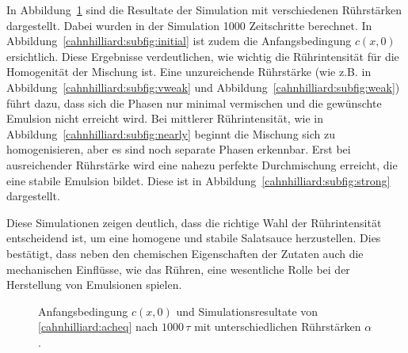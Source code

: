In Abbildung~\ref{cahnhilliard:fig:achsim}
sind die Resultate der Simulation mit verschiedenen Rührstärken dargestellt.
Dabei wurden in der Simulation 1000 Zeitschritte berechnet.
In Abbildung~\ref{cahnhilliard:subfig:initial}
ist zudem die Anfangsbedingung $c(x,0)$ ersichtlich.
Diese Ergebnisse verdeutlichen,
wie wichtig die Rührintensität für die Homogenität der Mischung ist.
Eine unzureichende Rührstärke
(wie z.B. in Abbildung~\ref{cahnhilliard:subfig:vweak}
und Abbildung~\ref{cahnhilliard:subfig:weak})
führt dazu,
dass sich die Phasen nur minimal vermischen
und die gewünschte Emulsion nicht erreicht wird.
Bei mittlerer Rührintensität,
wie in Abbildung~\ref{cahnhilliard:subfig:nearly}
beginnt die Mischung sich zu homogenisieren,
aber es sind noch separate Phasen erkennbar.
Erst bei ausreichender Rührstärke wird eine nahezu perfekte Durchmischung erreicht,
die eine stabile Emulsion bildet.
Diese ist in Abbildung~\ref{cahnhilliard:subfig:strong} dargestellt.

Diese Simulationen zeigen deutlich,
dass die richtige Wahl der Rührintensität entscheidend ist,
um eine homogene und stabile Salatsauce herzustellen.
Dies bestätigt,
dass neben den chemischen Eigenschaften der Zutaten auch die mechanischen Einflüsse,
wie das Rühren, eine wesentliche Rolle bei der Herstellung von Emulsionen spielen.

\begin{figure}
\centering
{}
%
%
%
%
%
\caption[Simulation der angepassten Cahn-Hilliard-Gleichung]{%
Anfangsbedingung $c(x,0)$ und
Simulationsresultate von \eqref{cahnhilliard:acheq} nach $1000\,\tau$
mit unterschiedlichen Rührstärken $\alpha$.}
\label{cahnhilliard:fig:achsim}
\end{figure}
